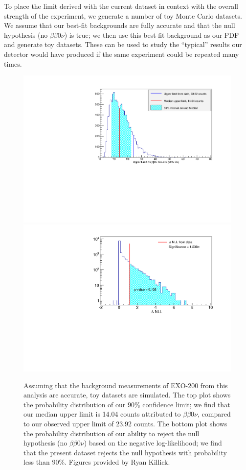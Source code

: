 To place the limit derived with the current dataset in context with the overall strength of the experiment, we generate a number of toy Monte Carlo datasets.  We assume that our best-fit backgrounds are fully accurate and that the null hypothesis (no $\beta\beta 0\nu$) is true; we then use this best-fit background as our PDF and generate toy datasets.  These can be used to study the ``typical'' results our detector would have produced if the same experiment could be repeated many times.

\begin{figure}
\begin{center}
\includegraphics[keepaspectratio=true,width=.9\textwidth]{toy_mc_sensitivity.pdf}
\includegraphics[keepaspectratio=true,width=.9\textwidth]{toy_mc_significance.pdf}
\end{center}
\renewcommand{\baselinestretch}{1}
\small\normalsize
\begin{quote}
\caption{Assuming that the background measurements of EXO-200 from this analysis are accurate, toy datasets are simulated.  The top plot shows the probability distribution of our $90\%$ confidence limit; we find that our median upper limit is 14.04 counts attributed to $\beta\beta 0\nu$, compared to our observed upper limit of 23.92 counts.  The bottom plot shows the probability distribution of our ability to reject the null hypothesis (no $\beta\beta 0\nu$) based on the negative log-likelihood; we find that the present dataset rejects the null hypothesis with probability less than $90\%$.  Figures provided by Ryan Killick.}
\label{fig:ToyMCSensitivitySelectivity}
\end{quote}
\end{figure}
